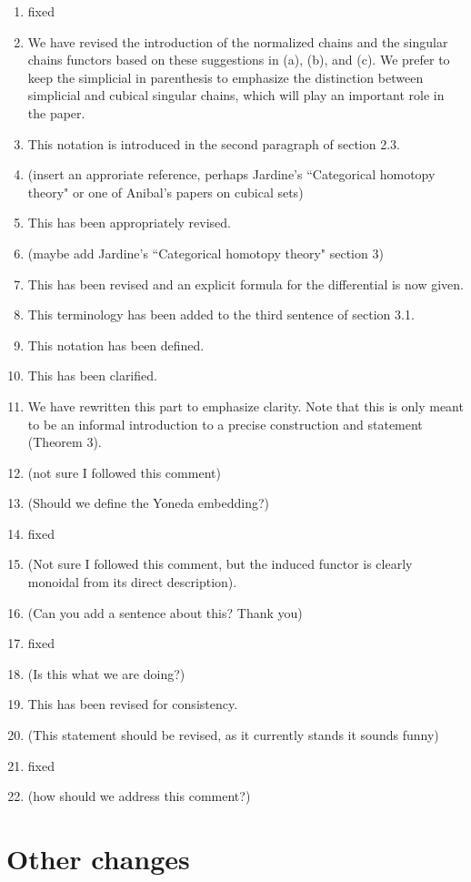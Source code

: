 \documentclass{amsart}
\begin{document}
	\begin{enumerate}
	\item fixed
 \item  We have revised the introduction of the normalized chains and the singular chains functors based on these suggestions in (a), (b), and (c).
  We prefer to keep the simplicial in parenthesis to emphasize the distinction between simplicial and cubical singular chains, which will play an important role in the paper. 
 \item This notation is introduced in the second paragraph of section 2.3. 
 \item (insert an approriate reference, perhaps Jardine's ``Categorical homotopy theory" or one of Anibal's papers on cubical sets)
 \item This has been appropriately revised.
 \item (maybe add Jardine's ``Categorical homotopy theory" section 3)
 \item  This has been revised and an explicit formula for the differential is now given. 
 \item This terminology has been added to the third sentence of section 3.1.
 \item This notation has been defined.
 \item This has been clarified. 
 \item We have rewritten this part to emphasize clarity. Note that this is only meant to be an informal introduction to a precise construction and statement (Theorem 3). 
 \item (not sure I followed this comment)
 \item (Should we define the Yoneda embedding?)
 \item fixed
 \item (Not sure I followed this comment, but the induced functor is clearly monoidal from its direct description). 
 \item (Can you add a sentence about this? Thank you)
\item fixed
\item (Is this what we are doing?)
 \item This has been revised for consistency. 
 \item (This statement should be revised, as it currently stands it sounds funny)
 \item fixed
 \item (how should we address this comment?)
 
 
 
	\end{enumerate}

	\section{Other changes}
\end{document}
